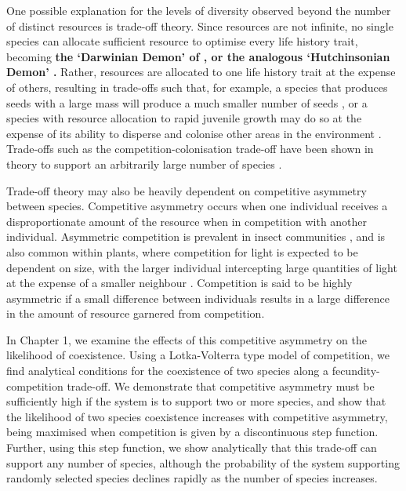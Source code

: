  One possible explanation for the levels of diversity observed beyond the number of distinct resources is trade-off theory. Since resources are not infinite, no single species can allocate sufficient resource to optimise every life history trait, becoming \textbf{the `Darwinian Demon' of \cite{law1979optimal}, or the analogous `Hutchinsonian Demon' \citep[e.g.][]{kneitel2004trade}.} Rather, resources are allocated to one life history trait  at the expense of others, resulting in trade-offs such that, for example, a species that produces seeds with a large mass will produce a much smaller number of seeds \citep[e.g.][]{greene1993seed,venable1992size}, or a species with resource allocation to rapid juvenile growth may do so at the expense of its ability to disperse and colonise other areas in the environment \citep[e.g.][]{tilman1994competition, cadotte2006testing}. Trade-offs such as the competition-colonisation trade-off have been shown in theory to support an arbitrarily large number of species \citep{tilman1994competition}.
 
 Trade-off theory may also be heavily dependent on competitive asymmetry between species. Competitive asymmetry occurs when one individual receives a disproportionate amount of the resource when in competition with another individual. Asymmetric competition is prevalent in insect communities \citep{lawton1981asymmetrical}, and is also common within plants, where competition for light is expected to be dependent on size, with the larger individual intercepting large quantities of light at the expense of a smaller neighbour \citep{weiner1990asymmetric}. Competition is said to be highly asymmetric if a small difference between individuals results in a large difference in the amount of resource garnered from competition.
 
 In Chapter 1, we examine the effects of this competitive asymmetry on the likelihood of coexistence. Using a Lotka-Volterra type model of competition, we find analytical conditions for the coexistence of two species along a fecundity-competition trade-off. We demonstrate that competitive asymmetry must be sufficiently high if the system is to support two or more species, and show that the likelihood of two species coexistence increases with competitive asymmetry, being maximised when competition is given by a discontinuous step function. Further, using this step function, we show analytically that this trade-off can support any number of species, although the probability of the system supporting randomly selected species declines rapidly as the number of species increases.
 
